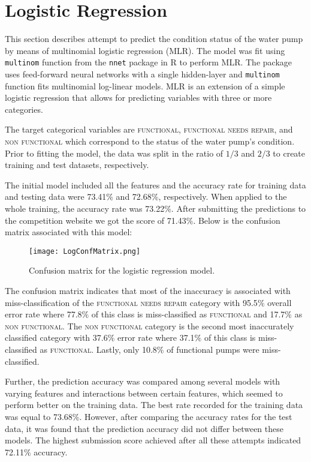 \large
\section{Logistic Regression} \label{logistic}
This section describes attempt to predict the condition status of the water pump by means of multinomial logistic regression (MLR). The model was fit using \texttt{multinom} function from the \texttt{nnet} package in R to perform MLR. The package uses feed-forward neural networks with a single hidden-layer and \texttt{multinom} function fits multinomial log-linear models. MLR is an extension of a simple logistic regression that allows for predicting variables with three or more categories. 

The target categorical variables are \textsc{functional, functional needs repair,} and \textsc{non functional} which correspond to the status of the water pump's condition. Prior to fitting the model, the data was split in the ratio of $1/3$ and $2/3$ to create training and test datasets, respectively. 

The initial model included all the features and the accuracy rate for training data and testing data were 73.41$\%$ and 72.68$\%$, respectively. When applied to the whole training, the accuracy rate was 73.22$\%$. After submitting the predictions to the competition website we got the score of 71.43$\%$. Below is the confusion matrix associated with this model:

\begin{figure}[h]
    \centering
    \texttt{[image: LogConfMatrix.png]}
    \caption{Confusion matrix for the logistic regression model.}
    \label{fig:NonNormalHists}
\end{figure}

The confusion matrix indicates that most of the inaccuracy is associated with miss-classification of the \textsc{functional needs repair} category with 95.5$\%$ overall error rate where 77.8$\%$ of this class is miss-classified as \textsc{functional} and 17.7$\%$ as \textsc{non functional}. The \textsc{non functional} category is the second most inaccurately classified category with 37.6$\%$ error rate where 37.1$\%$ of this class is miss-classified as \textsc{functional}. Lastly, only 10.8$\%$ of functional pumps were miss-classified. 

Further, the prediction accuracy was compared among several models with varying features and interactions between certain features, which seemed to perform better on the training data. The best rate recorded for the training data was equal to 73.68$\%$. However, after comparing the accuracy rates for the test data, it was found that the prediction accuracy did not differ between these models. The highest submission score achieved after all these attempts indicated 72.11$\%$ accuracy.  
